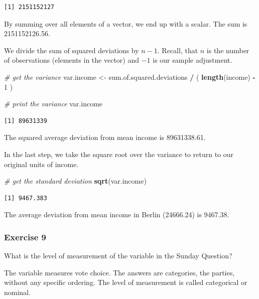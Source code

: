 \documentclass[]{article}
\newenvironment{Shaded}{\begin{snugshade}}{\end{snugshade}}
\newcommand{\KeywordTok}[1]{\textcolor[rgb]{0.13,0.29,0.53}{\textbf{#1}}}
\newcommand{\DecValTok}[1]{\textcolor[rgb]{0.00,0.00,0.81}{#1}}
\newcommand{\StringTok}[1]{\textcolor[rgb]{0.31,0.60,0.02}{#1}}
\newcommand{\CommentTok}[1]{\textcolor[rgb]{0.56,0.35,0.01}{\textit{#1}}}
\newcommand{\OperatorTok}[1]{\textcolor[rgb]{0.81,0.36,0.00}{\textbf{#1}}}
\newcommand{\NormalTok}[1]{#1}
\theoremstyle{definition}
\theoremstyle{definition}
\theoremstyle{definition}
\theoremstyle{remark}
\begin{document}
\begin{verbatim}
[1] 2151152127
\end{verbatim}

By summing over all elements of a vector, we end up with a scalar. The
sum is 2151152126.56.

We divide the sum of squared deviations by \(n-1\). Recall, that \(n\)
is the number of observations (elements in the vector) and \(-1\) is our
sample adjustment.

\begin{Shaded}
\begin{Highlighting}[]
\CommentTok{# get the variance}
\NormalTok{var.income <-}\StringTok{ }\NormalTok{sum.of.squared.deviations }\OperatorTok{/}\StringTok{ }\NormalTok{( }\KeywordTok{length}\NormalTok{(income) }\OperatorTok{-}\StringTok{ }\DecValTok{1}\NormalTok{ )}

\CommentTok{# print the variance}
\NormalTok{var.income}
\end{Highlighting}
\end{Shaded}

\begin{verbatim}
[1] 89631339
\end{verbatim}

The squared average deviation from mean income is 89631338.61.

In the last step, we take the square root over the variance to return to
our original units of income.

\begin{Shaded}
\begin{Highlighting}[]
\CommentTok{# get the standard deviation}
\KeywordTok{sqrt}\NormalTok{(var.income)}
\end{Highlighting}
\end{Shaded}

\begin{verbatim}
[1] 9467.383
\end{verbatim}

The average deviation from mean income in Berlin (24666.24) is 9467.38.

\subsubsection{Exercise 9}\label{exercise-9}

What is the level of measurement of the variable in the Sunday Question?

The variable measures vote choice. The answers are categories, the
parties, without any specific ordering. The level of measurement is
called categorical or nominal.
\end{document}
